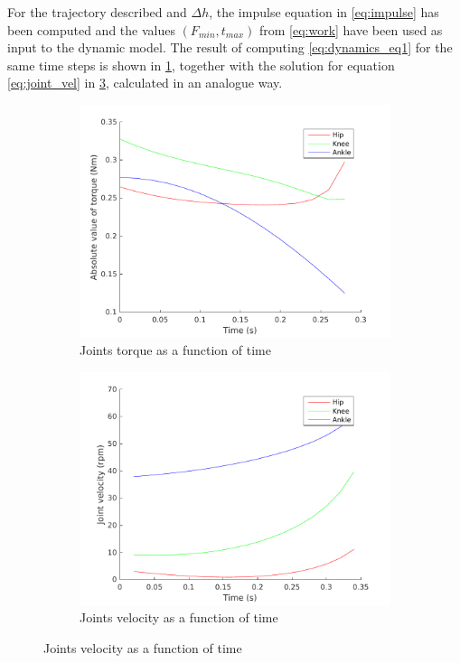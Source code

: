 For the trajectory described and $\Delta h$, the impulse equation in \ref{eq:impulse} has been computed and the values $(F_{min}, t_{max})$ from \ref{eq:work} have been used as input to the dynamic model.
The result of computing \ref{eq:dynamics_eq1} for the same time steps is shown in \ref{fig:controller_torque}, together with the solution for equation \ref{eq:joint_vel} in \ref{fig:controller_speed}, calculated in an analogue way.

\begin{figure}[htb]
    \centering
    \begin{subfigure}{0.49\textwidth}
        \includegraphics[width=\textwidth]{figures/torque-time.pdf}
		\caption{Joints torque as a function of time}
		\label{fig:controller_torque}
	\end{subfigure}	
    \begin{subfigure}{0.49\textwidth}
        \includegraphics[width=\textwidth]{figures/speed-time.pdf}
		\caption{Joints velocity as a function of time}
		\label{fig:controller_speed}
    \end{subfigure}
\end{figure}


